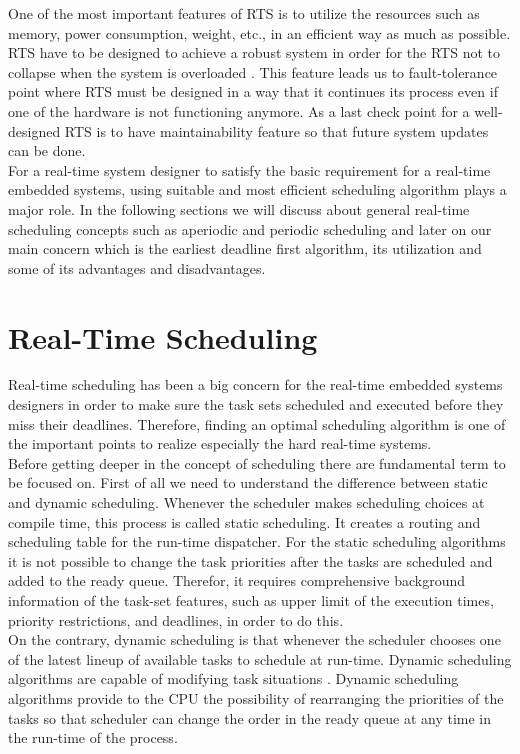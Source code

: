 \documentclass[conference]{IEEEtran}
\begin{document}
One of the most important features of RTS is to utilize the resources such as memory, power consumption, weight, etc.,  in an efficient way as much as possible. RTS have to be designed to achieve a robust system in order for the RTS not to collapse when the system is overloaded \cite{hrts}. This feature leads us to fault-tolerance point where RTS must be designed in a way that it continues its process even if one of the hardware is not functioning anymore. As a last check point for a well-designed RTS is to have maintainability feature so that future system updates can be done.\\

For a real-time system designer to satisfy the basic requirement for a real-time embedded systems, using suitable and most efficient scheduling algorithm plays a major role. In the following sections we will discuss about general real-time scheduling concepts such as aperiodic and periodic scheduling and later on our main concern which is the earliest deadline first algorithm, its utilization and some of its advantages and disadvantages. \\

\section{Real-Time Scheduling}
Real-time scheduling has been a big concern for the real-time embedded systems designers in order to make sure the task sets scheduled and executed before they miss their deadlines. Therefore, finding an optimal scheduling algorithm is one of the important points to realize especially the hard real-time systems. \\

Before getting deeper in the concept of scheduling there are fundamental term to be focused on. First of all we need to understand the difference between static and dynamic scheduling. Whenever the scheduler makes scheduling choices at compile time, this process is called static scheduling. It creates a routing and scheduling table for the run-time dispatcher\cite{rts}. For the static scheduling algorithms it is not possible to change the task priorities after the tasks are scheduled and added to the ready queue. Therefor, it requires comprehensive background information of the task-set features, such as upper limit of the execution times, priority restrictions, and deadlines, in order to do this\cite{rts}.\\

On the contrary, dynamic scheduling is that whenever the scheduler chooses one of the latest lineup of available tasks to schedule at run-time. Dynamic scheduling algorithms are capable of modifying task situations \cite{rts}. Dynamic scheduling algorithms provide to the CPU the possibility of rearranging the priorities of the tasks so that scheduler can change the order in the ready queue at any time in the run-time of the process.  \\
\end{document}
